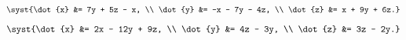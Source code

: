 \begin{multicols}{3}
\begin{enumtasks}
			\item \( \syst{\dot{x} &= 7y + 5z - x, \\ \dot{y} &= -x - 7y - 4z, \\ \dot{z} &= x + 9y + 6z.} \) %
			\item \( \syst{\dot{x} &= 2x - 12y + 9z, \\ \dot{y} &= 4z - 3y, \\ \dot{z} &= 3z - 2y.} \) %

\end{enumtasks}
\end{multicols}
